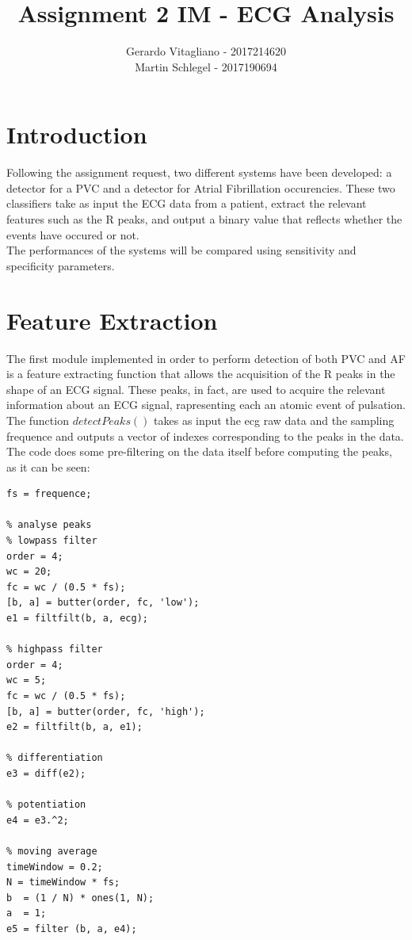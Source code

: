 \documentclass[a4paper,titlepage]{article}
\begin{document}
\title{Assignment 2 IM - ECG Analysis}
\author{Gerardo Vitagliano - 2017214620 \\ Martin Schlegel - 2017190694 }
\date{\vspace{-5ex}}
\vfill
\maketitle
\clearpage
\section{Introduction}
Following the assignment request, two different systems have been developed: a detector for a PVC and a detector for Atrial Fibrillation occurencies. These two classifiers take as input the ECG data from a patient, extract the relevant features such as the R peaks, and output a binary value that reflects whether the events have occured or not.\\
The performances of the systems will be compared using sensitivity and specificity parameters.


\section{Feature Extraction}
The first module implemented in order to perform detection of both PVC and AF is a feature extracting function that allows the acquisition of the R peaks in the shape of an ECG signal. These peaks, in fact, are used to acquire the relevant information about an ECG signal, rapresenting each an atomic event of pulsation.\\
The function $detectPeaks()$ takes as input the ecg raw data and the sampling frequence and outputs a vector of indexes corresponding to the peaks in the data.
The code does some pre-filtering on the data itself before computing the peaks, as it can be seen:
\begin {lstlisting}[caption=Pre-filtering]
fs = frequence;

order = 4;
wc = 20;
fc = wc / (0.5 * fs);
[b, a] = butter(order, fc, 'low');
e1 = filtfilt(b, a, ecg);

order = 4;
wc = 5;
fc = wc / (0.5 * fs);
[b, a] = butter(order, fc, 'high');
e2 = filtfilt(b, a, e1);

e3 = diff(e2);

e4 = e3.^2;

timeWindow = 0.2;
N = timeWindow * fs;
b  = (1 / N) * ones(1, N);
a  = 1;
e5 = filter (b, a, e4);
\end{lstlisting}
\end{document}
